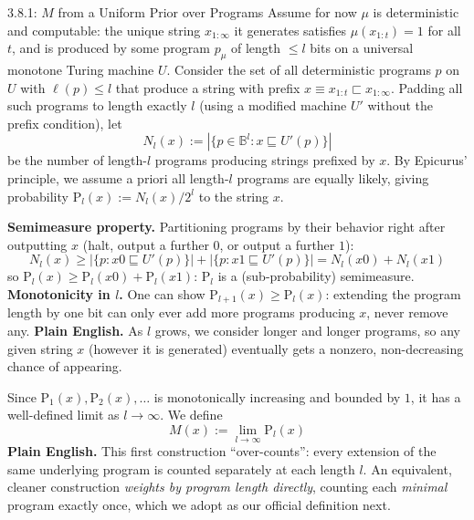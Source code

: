\documentclass[aspectratio=169,10pt]{beamer}
\newcommand{\B}{\mathbb{B}}
\begin{document}
\begin{frame}[allowframebreaks]{3.8.1: $M$ from a Uniform Prior over Programs}
  Assume for now $\mu$ is deterministic and computable: the unique string
  $x_{1:\infty}$ it generates satisfies $\mu(x_{1:t})=1$ for all $t$, and is
  produced by some program $p_\mu$ of length $\le l$ bits on a universal
  monotone Turing machine $U$. Consider the set of all deterministic programs
  $p$ on $U$ with $\ell(p)\le l$ that produce a string with prefix
  $x\equiv x_{1:t}\sqsubset x_{1:\infty}$. Padding all such programs to length
  exactly $l$ (using a modified machine $U'$ without the prefix condition),
  let
  \[
    N_l(x) := |\{p\in\B^l : x \sqsubseteq U'(p)\}|
  \]
  be the number of length-$l$ programs producing strings prefixed by $x$. By
  Epicurus' principle, we assume a priori all length-$l$ programs are equally
  likely, giving probability $\mathrm{P}_l(x):=N_l(x)/2^l$ to the string $x$.

  \framebreak
  \textbf{Semimeasure property.} Partitioning programs by their behavior
  right after outputting $x$ (halt, output a further $0$, or output a
  further $1$):
  \[
    N_l(x) \ge |\{p:x0\sqsubseteq U'(p)\}| + |\{p:x1\sqsubseteq U'(p)\}| = N_l(x0)+N_l(x1)
  \]
  so $\mathrm{P}_l(x)\ge \mathrm{P}_l(x0)+\mathrm{P}_l(x1)$: $\mathrm{P}_l$ is a
  (sub-probability) semimeasure. \textbf{Monotonicity in $l$.} One can show
  $\mathrm{P}_{l+1}(x)\ge \mathrm{P}_l(x)$: extending the program length by one
  bit can only ever add more programs producing $x$, never remove any.
  \textbf{Plain English.} As $l$ grows, we consider longer and longer
  programs, so any given string $x$ (however it is generated) eventually gets
  a nonzero, non-decreasing chance of appearing.

  \framebreak
  Since $\mathrm{P}_1(x),\mathrm{P}_2(x),\dots$ is monotonically increasing
  and bounded by $1$, it has a well-defined limit as $l\to\infty$. We define
  \[
    M(x) := \lim_{l\to\infty} \mathrm{P}_l(x) \tag{3.8.1}
  \]
  \textbf{Plain English.} This first construction ``over-counts'': every
  extension of the same underlying program is counted separately at each
  length $l$. An equivalent, cleaner construction \emph{weights by program
  length directly}, counting each \emph{minimal} program exactly once, which
  we adopt as our official definition next.
\end{frame}
\end{document}
